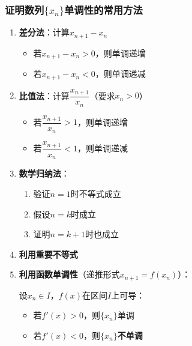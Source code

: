 \documentclass[../book.tex]{subfiles}
\begin{document}
    \subsubsection{证明数列$\{x_n\}$单调性的常用方法}
    \begin{enumerate}
        \item \textbf{差分法}：计算$x_{n+1} - x_n$
        \begin{itemize}
            \item 若$x_{n+1} - x_n > 0$，则单调递增
            \item 若$x_{n+1} - x_n < 0$，则单调递减
        \end{itemize}

        \item \textbf{比值法}：计算$\dfrac{x_{n+1}}{x_n}$（要求$x_n > 0$）
        \begin{itemize}
            \item 若$\dfrac{x_{n+1}}{x_n} > 1$，则单调递增
            \item 若$\dfrac{x_{n+1}}{x_n} < 1$，则单调递减
        \end{itemize}

        \item \textbf{数学归纳法}：
        \begin{enumerate}
            \item 验证$n=1$时不等式成立
            \item 假设$n=k$时成立
            \item 证明$n=k+1$时也成立
        \end{enumerate}
        \item \textbf{利用重要不等式}
        \item \textbf{利用函数单调性}（递推形式$x_{n+1} = f(x_n)$）：

        设$x_n \in I$，$f(x)$在区间$I$上可导：
        \begin{itemize}
            \item 若$f'(x) > 0$，则$\{x_n\}$单调
            \item 若$f'(x) < 0$，则$\{x_n\}$\textbf{不单调}
        \end{itemize}
    \end{enumerate}
\end{document}
